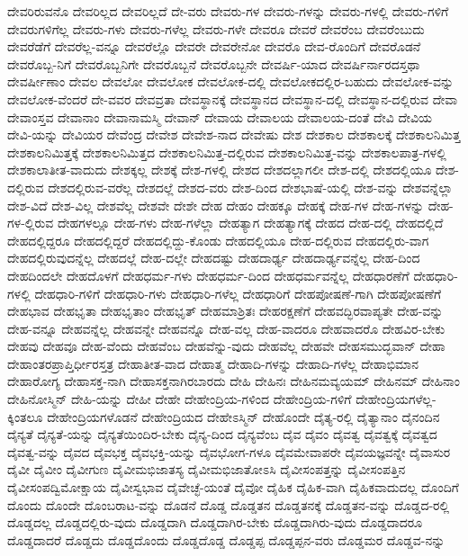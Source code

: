 {ದೇವರಿರುವನೊ
ದೇವರಿಲ್ಲದ
ದೇವರಿಲ್ಲದೆ
ದೇ-ವರು
ದೇವರು-ಗಳ
ದೇವರು-ಗಳನ್ನು
ದೇವರು-ಗಳಲ್ಲಿ
ದೇವರು-ಗಳಿಗೆ
ದೇವರುಗಳಿಗೆಲ್ಲ
ದೇವರು-ಗಳು
ದೇವರು-ಗಳೆಲ್ಲ
ದೇವರು-ಗಳೇ
ದೇವರೂ
ದೇವರೆ
ದೇವರೆಂಬ
ದೇವರೆಂಬುದು
ದೇವರೆಡೆಗೆ
ದೇವರೆಲ್ಲ-ವನ್ನೂ
ದೇವರೆಲ್ಲೊ
ದೇವರೇ
ದೇವರೇನೋ
ದೇವರೊ
ದೇವ-ರೊಂದಿಗೆ
ದೇವರೊಡನೆ
ದೇವರೊಬ್ಬ-ನಿಗೆ
ದೇವರೊಬ್ಬನಿಗೇ
ದೇವರೊಬ್ಬನೆ
ದೇವರೊಬ್ಬನೇ
ದೇವರ್ಷಿ-ಯಾದ
ದೇವರ್ಷಿರ್ನಾರದಸ್ತಥಾ
ದೇವರ್ಷೀಣಾಂ
ದೇವಲ
ದೇವಲೋ
ದೇವಲೋಕ
ದೇವಲೋಕ-ದಲ್ಲಿ
ದೇವಲೋಕದಲ್ಲಿರ-ಬಹುದು
ದೇವಲೋಕ-ವನ್ನು
ದೇವಲೋಕ-ವೆಂದರೆ
ದೇ-ವವರ
ದೇವವ್ರತಾ
ದೇವಸ್ಥಾನಕ್ಕೆ
ದೇವಸ್ಥಾನದ
ದೇವಸ್ಥಾನ-ದಲ್ಲಿ
ದೇವಸ್ಥಾನ-ದಲ್ಲಿರುವ
ದೇವಾ
ದೇವಾಂಸ್ತವ
ದೇವಾನಾಂ
ದೇವಾನಾಮಸ್ಮಿ
ದೇವಾನ್
ದೇವಾಯ
ದೇವಾಲಯ
ದೇವಾಲಯ-ದಂತೆ
ದೇವಿ
ದೇವಿಯ
ದೇವಿ-ಯನ್ನು
ದೇವಿಯರ
ದೇವೆಂದ್ರ
ದೇವೇಶ
ದೇವೇಶ-ನಾದ
ದೇವೇಷು
ದೇಶ
ದೇಶಕಾಲ
ದೇಶಕಾಲಕ್ಕೆ
ದೇಶಕಾಲನಿಮಿತ್ತ
ದೇಶಕಾಲನಿಮಿತ್ತಕ್ಕೆ
ದೇಶಕಾಲನಿಮಿತ್ತದ
ದೇಶಕಾಲನಿಮಿತ್ತ-ದಲ್ಲಿರುವ
ದೇಶಕಾಲನಿಮಿತ್ತ-ವನ್ನು
ದೇಶಕಾಲಪಾತ್ರ-ಗಳಲ್ಲಿ
ದೇಶಕಾಲಾತೀತ-ವಾದುದು
ದೇಶಕ್ಕಲ್ಲ
ದೇಶಕ್ಕೆ
ದೇಶ-ಗಳಲ್ಲಿ
ದೇಶದ
ದೇಶದಲ್ಲಾಗಲೀ
ದೇಶ-ದಲ್ಲಿ
ದೇಶದಲ್ಲಿಯೂ
ದೇಶ-ದಲ್ಲಿರುವ
ದೇಶದಲ್ಲಿರುವ-ವರೆಲ್ಲ
ದೇಶದಲ್ಲೆ
ದೇಶದ-ವರು
ದೇಶ-ದಿಂದ
ದೇಶಭಾಷೆ-ಯಲ್ಲಿ
ದೇಶ-ವನ್ನು
ದೇಶವನ್ನೆಲ್ಲಾ
ದೇಶ-ವಿದೆ
ದೇಶ-ವಿಲ್ಲ
ದೇಶವೆಲ್ಲ
ದೇಶವೇ
ದೇಶೇ
ದೇಹ
ದೇಹಂ
ದೇಹಕ್ಕೂ
ದೇಹಕ್ಕೆ
ದೇಹ-ಗಳ
ದೇಹ-ಗಳನ್ನು
ದೇಹ-ಗಳ-ಲ್ಲಿರುವ
ದೇಹಗಳಲ್ಲೂ
ದೇಹ-ಗಳು
ದೇಹ-ಗಳೆಲ್ಲಾ
ದೇಹತ್ಯಾಗ
ದೇಹತ್ಯಾಗಕ್ಕೆ
ದೇಹದ
ದೇಹ-ದಲ್ಲಿ
ದೇಹದಲ್ಲಿದೆ
ದೇಹದಲ್ಲಿದ್ದರೂ
ದೇಹದಲ್ಲಿದ್ದರೆ
ದೇಹದಲ್ಲಿದ್ದು-ಕೊಂಡು
ದೇಹದಲ್ಲಿಯೂ
ದೇಹ-ದಲ್ಲಿರುವ
ದೇಹದಲ್ಲಿರು-ವಾಗ
ದೇಹದಲ್ಲಿರುವುದನ್ನೆಲ್ಲ
ದೇಹದಲ್ಲೆ
ದೇಹ-ದಲ್ಲೇ
ದೇಹದಷ್ಟು
ದೇಹದಾರ್ಢ್ಯ
ದೇಹದಾರ್ಢ್ಯವನ್ನೆಲ್ಲ
ದೇಹ-ದಿಂದ
ದೇಹದಿಂದಲೇ
ದೇಹದೊಳಗೆ
ದೇಹಧರ್ಮ-ಗಳು
ದೇಹಧರ್ಮ-ದಿಂದ
ದೇಹಧರ್ಮವನ್ನೆಲ್ಲ
ದೇಹಧಾರಣೆಗೆ
ದೇಹಧಾರಿ-ಗಳಲ್ಲಿ
ದೇಹಧಾರಿ-ಗಳಿಗೆ
ದೇಹಧಾರಿ-ಗಳು
ದೇಹಧಾರಿ-ಗಳೆಲ್ಲ
ದೇಹಧಾರಿಗೆ
ದೇಹಪೋಷಣೆ-ಗಾಗಿ
ದೇಹಪೋಷಣೆಗೆ
ದೇಹಭಾವ
ದೇಹಭೃತಾ
ದೇಹಭೃತಾಂ
ದೇಹಭೃತ್
ದೇಹಮಾಶ್ರಿತಃ
ದೇಹರಕ್ಷಣೆಗೆ
ದೇಹವದ್ಭಿರವಾಪ್ಯತೇ
ದೇಹ-ವನ್ನು
ದೇಹ-ವನ್ನೂ
ದೇಹವನ್ನೆಲ್ಲ
ದೇಹವನ್ನೇ
ದೇಹವನ್ನೊ
ದೇಹ-ವಲ್ಲ
ದೇಹ-ವಾದರೂ
ದೇಹವಾದರೊ
ದೇಹವಿರ-ಬೇಕು
ದೇಹವು
ದೇಹವೂ
ದೇಹ-ವೆಂದು
ದೇಹವೆಂಬ
ದೇಹವೆನ್ನು-ವುದು
ದೇಹವೆಲ್ಲ
ದೇಹವೇ
ದೇಹಸಮುದ್ಭವಾನ್
ದೇಹಾ
ದೇಹಾಂತರಪ್ರಾಪ್ತಿರ್ಧೀರಸ್ತತ್ರ
ದೇಹಾತೀತ-ವಾದ
ದೇಹಾತ್ಮ
ದೇಹಾದಿ-ಗಳನ್ನು
ದೇಹಾದಿ-ಗಳೆಲ್ಲ
ದೇಹಾಭಿಮಾನ
ದೇಹಾರೋಗ್ಯ
ದೇಹಾಸಕ್ತ-ನಾಗಿ
ದೇಹಾಸಕ್ತನಾಗಿರಬಾರದು
ದೇಹಿ
ದೇಹಿನಃ
ದೇಹಿನಮವ್ಯಯಮ್
ದೇಹಿನಮ್
ದೇಹಿನಾಂ
ದೇಹಿನೋಸ್ಮಿನ್
ದೇಹಿ-ಯನ್ನು
ದೇಹೀ
ದೇಹೇ
ದೇಹೇಂದ್ರಿಯ-ಗಳಿಂದ
ದೇಹೇಂದ್ರಿಯ-ಗಳಿಗೆ
ದೇಹೇಂದ್ರಿಯಗಳೆಲ್ಲ-ಕ್ಕಿಂತಲೂ
ದೇಹೇಂದ್ರಿಯಗಳೊಡನೆ
ದೇಹೇಂದ್ರಿಯದ
ದೇಹೇಽಸ್ಮಿನ್
ದೇಹೊಂದೇ
ದೈತ್ಯ-ರಲ್ಲಿ
ದೈತ್ಯಾನಾಂ
ದೈನಂದಿನ
ದೈನ್ಯತೆ
ದೈನ್ಯತೆ-ಯನ್ನು
ದೈನ್ಯತೆಯಿಂದಿರ-ಬೇಕು
ದೈನ್ಯ-ದಿಂದ
ದೈನ್ಯವೆಂಬ
ದೈವ
ದೈವಂ
ದೈವತ್ವ
ದೈವತ್ವಕ್ಕೆ
ದೈವತ್ವದ
ದೈವತ್ವ-ವನ್ನು
ದೈವದ
ದೈವಭಕ್ತ
ದೈವಭಕ್ತಿ-ಯನ್ನು
ದೈವಭೋಗ-ಗಳೂ
ದೈವಮೇವಾಪರೇ
ದೈವಯಜ್ಞವನ್ನೇ
ದೈವಾಸುರ
ದೈವೀ
ದೈವೀಂ
ದೈವೀಗುಣ
ದೈವೀಮಭಿಜಾತಸ್ಯ
ದೈವೀಮಭಿಜಾತೋಽಸಿ
ದೈವೀಸಂಪತ್ತನ್ನು
ದೈವೀಸಂಪತ್ತಿನ
ದೈವೀಸಂಪದ್ವಿಮೋಕ್ಷಾಯ
ದೈವೀಸ್ವಭಾವ
ದೈವೇಚ್ಛೆ-ಯಂತೆ
ದೈವೋ
ದೈಹಿಕ
ದೈಹಿಕ-ವಾಗಿ
ದೈಹಿಕವಾದುದಲ್ಲ
ದೊಂದಿಗೆ
ದೊಂದು
ದೊಂದೇ
ದೊಂಬರಾಟ-ವನ್ನು
ದೊಡನೆ
ದೊಡ್ಡ
ದೊಡ್ಡತನ
ದೊಡ್ಡತನಕ್ಕೆ
ದೊಡ್ಡತನ-ವನ್ನು
ದೊಡ್ಡದ-ರಲ್ಲಿ
ದೊಡ್ಡದಲ್ಲ
ದೊಡ್ಡದಲ್ಲಿರು-ವುದು
ದೊಡ್ಡದಾಗಿ
ದೊಡ್ಡದಾಗಿರ-ಬೇಕು
ದೊಡ್ಡದಾಗಿರು-ವುದು
ದೊಡ್ಡದಾದರೂ
ದೊಡ್ಡದಾದರೆ
ದೊಡ್ಡದು
ದೊಡ್ಡದೊಂದು
ದೊಡ್ಡದೊಡ್ಡ
ದೊಡ್ಡಪ್ಪ
ದೊಡ್ಡಪ್ಪನ-ವರು
ದೊಡ್ಡಮರ
ದೊಡ್ಡವ-ನನ್ನು
}
